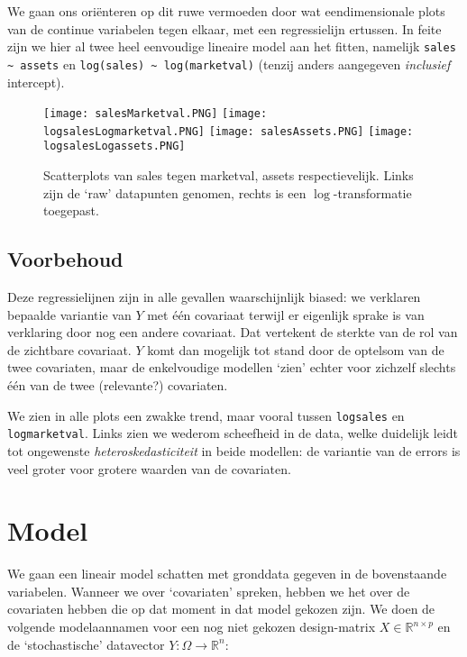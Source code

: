 \documentclass[a4paper]{report}
\begin{document}
  We gaan ons ori\"enteren op dit ruwe vermoeden door wat eendimensionale plots van de continue variabelen tegen elkaar, met een regressielijn ertussen. In feite zijn we hier al twee heel eenvoudige lineaire model aan het fitten, namelijk \verb!sales ~ assets! en \verb!log(sales) ~ log(marketval)! (tenzij anders aangegeven \emph{inclusief} intercept).
  
  \begin{figure}[H]
  \begin{center}
  \texttt{[image: salesMarketval.PNG]}
  \texttt{[image: logsalesLogmarketval.PNG]}
  \texttt{[image: salesAssets.PNG]}
  \texttt{[image: logsalesLogassets.PNG]}
  \end{center}
  \caption{Scatterplots van sales tegen marketval, assets respectievelijk. Links zijn de `raw' datapunten genomen, rechts is een $\log$-transformatie toegepast.}
  \end{figure}
  
\subsection{Voorbehoud}
  
  Deze regressielijnen zijn in alle gevallen waarschijnlijk biased: we verklaren bepaalde variantie van $Y$ met \' e\' en covariaat terwijl er eigenlijk sprake is van verklaring door nog een andere covariaat. Dat vertekent de sterkte van de rol van de zichtbare covariaat. $Y$ komt dan mogelijk tot stand door de optelsom van de twee covariaten, maar de enkelvoudige modellen `zien' echter voor zichzelf slechts \' e\' en van de twee (relevante?) covariaten. 

  We zien in alle plots een zwakke trend, maar vooral tussen \verb!logsales! en \verb!logmarketval!. Links zien we wederom scheefheid in de data, welke duidelijk leidt tot ongewenste \emph{heteroskedasticiteit} in beide modellen: de variantie van de errors is veel groter voor grotere waarden van de covariaten.
  
\section{Model}  
\label{Model}
  We gaan een lineair model schatten met gronddata gegeven in de bovenstaande variabelen. Wanneer we over `covariaten' spreken, hebben we het over de covariaten hebben die op dat moment in dat model gekozen zijn. We doen de volgende modelaannamen voor een nog niet gekozen design-matrix $X \in \mathbb{R}^{n\times p}$ en de `stochastische' datavector $Y: \Omega \rightarrow \mathbb{R}^n$:
  
\end{document}
